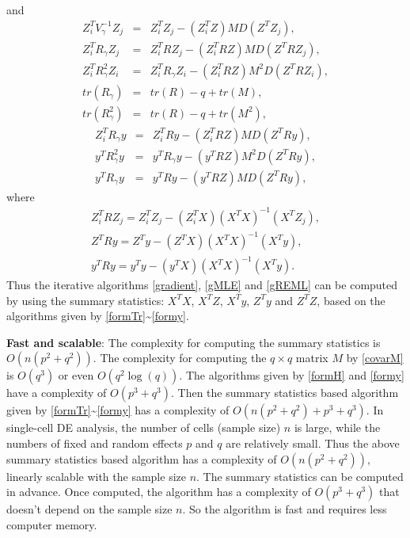 \documentclass[
]{article}
\begin{document}
and \begin{equation}\label{formH}
\begin{array}{ccl}
Z^T_iV_{\gamma}^{-1}Z_j &=& Z_i^TZ_j - (Z_i^TZ)MD(Z^TZ_j),\\
Z^T_iR_{\gamma}Z_j &=& Z_i^TRZ_j - (Z_i^TRZ)MD(Z^TRZ_j),\\
Z^T_iR_{\gamma}^2Z_i &=& Z^T_iR_{\gamma}Z_i - (Z_i^TRZ)M^2D(Z^TRZ_i),\\
tr(R_{\gamma}) &=& tr(R)-q+tr(M),\\
tr(R_{\gamma}^2) &=& tr(R)-q+tr(M^2),
\end{array}
\end{equation} \begin{equation}\label{formy}
\begin{array}{ccl}
Z^T_iR_{\gamma}y &=& Z_i^TRy - (Z_i^TRZ)MD(Z^TRy),\\
y^TR_{\gamma}^2y &=& y^TR_{\gamma}y - (y^TRZ)M^2D(Z^TRy),\\
y^TR_{\gamma}y &=& y^TRy - (y^TRZ)MD(Z^TRy),
\end{array}
\end{equation} where \begin{equation}\label{formSS}
\begin{array}{c}
Z_i^TRZ_j = Z_i^TZ_j - (Z_i^TX)(X^TX)^{-1}(X^TZ_j),\\
Z^TRy = Z^Ty - (Z^TX)(X^TX)^{-1}(X^Ty),\\
y^TRy = y^Ty - (y^TX)(X^TX)^{-1}(X^Ty).
\end{array}
\end{equation} Thus the iterative algorithms \eqref{gradient},
\eqref{gMLE} and \eqref{gREML} can be computed by using the summary
statistics: \(X^TX\), \(X^TZ\), \(X^Ty\), \(Z^Ty\) and \(Z^TZ\), based
on the algorithms given by \eqref{formTr}\textasciitilde{}\eqref{formy}.

\textbf{Fast and scalable}: The complexity for computing the summary
statistics is \(O(n(p^2 + q^2))\). The complexity for computing the
\(q\times q\) matrix \(M\) by \eqref{covarM} is \(O(q^3)\) or even
\(O(q^2\log(q))\). The algorithms given by \eqref{formH} and
\eqref{formy} have a complexity of \(O(p^3+q^3)\). Then the summary
statistics based algorithm given by
\eqref{formTr}\textasciitilde{}\eqref{formy} has a complexity of
\(O(n(p^2 + q^2)+p^3+q^3)\). In single-cell DE analysis, the number of
cells (sample size) \(n\) is large, while the numbers of fixed and
random effects \(p\) and \(q\) are relatively small. Thus the above
summary statistics based algorithm has a complexity of
\(O(n(p^2+q^2))\), linearly scalable with the sample size \(n\). The
summary statistics can be computed in advance. Once computed, the
algorithm has a complexity of \(O(p^3+q^3)\) that doesn't depend on the
sample size \(n\). So the algorithm is fast and requires less computer
memory.
\end{document}
